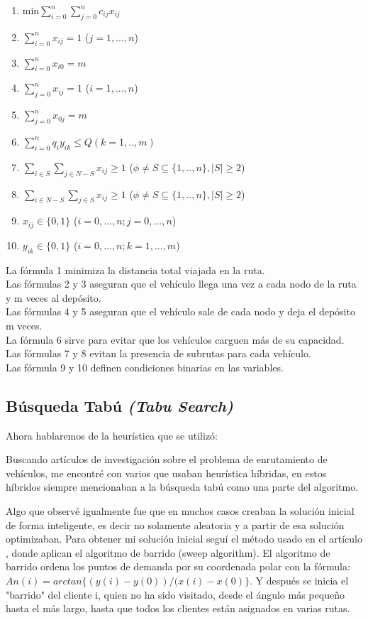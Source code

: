 \documentclass{article}
\begin{document}
\begin{enumerate}
	\item min$\sum_{i=0}^{n}\sum_{j=0}^{n} c_{ij} x_{ij}$
	\item $\sum_{i=0}^{n}x_{ij} = 1$  ($j = 1,...,n$)
	\item $\sum_{i=0}^{n}x_{i0} = m$
	\item $\sum_{j=0}^{n}x_{ij} = 1$  ($i = 1,...,n$)
	\item $\sum_{j=0}^{n}x_{0j} = m$
	\item $\sum_{i=0}^{n}q_iy_{ik} \leq Q(k=1,..,m)$
	\item $\sum_{i \in S}\sum_{j \in N - S} x_{ij} \geq 1$ ($\phi \neq S \subseteq \{1,..,n\}, |S| \geq 2$)
	\item $\sum_{i \in N-S}\sum_{j \in S} x_{ij} \geq 1$ ($\phi \neq S \subseteq \{1,..,n\}, |S| \geq 2$)
	\item $x_{ij} \in \{0,1\}$ ($i=0,...,n;j=0,...,n$)
	\item $y_{ik} \in \{0,1\}$ ($i=0,...,n;k=1,...,m$)
\end{enumerate}

La fórmula 1 minimiza la distancia total viajada en la ruta.\\
Las fórmulas 2 y 3 aseguran que el vehículo llega una vez a cada nodo de la ruta y m veces al depósito.\\
Las fórmulas 4 y 5 aseguran que el vehículo sale de cada nodo y deja el depósito m veces.\\
La fórmula 6 sirve para evitar que los vehículos carguen más de su capacidad.\\
Las fórmulas 7 y 8 evitan la presencia de subrutas para cada vehículo.\\
Las fórmula 9 y 10 definen condiciones binarias en las variables.\\

\subsection{Búsqueda Tabú \emph{(Tabu Search)}}
Ahora hablaremos de la heurística que se utilizó:

Buscando artículos de investigación sobre el problema de enrutamiento de vehículos, me encontré con varios que usaban heurística híbridas, en estos híbridos siempre mencionaban a la búsqueda tabú como una parte del algoritmo.

Algo que observé igualmente fue que en muchos casos creaban la solución inicial de forma inteligente, es decir no solamente aleatoria y a partir de esa solución optimizaban. Para obtener mi solución inicial seguí el método usado en el artículo \cite{hybrid}, donde aplican el algoritmo de barrido (sweep algorithm). El algoritmo de barrido ordena los puntos de demanda por su coordenada polar con la fórmula: $An(i) = arctan \{(y(i)-y(0))/(x(i)-x(0)\}$. Y después se inicia el "barrido" del cliente i, quien no ha sido visitado, desde el ángulo más pequeño hasta el más largo, hasta que todos los clientes están asignados en varias rutas.
\end{document}
